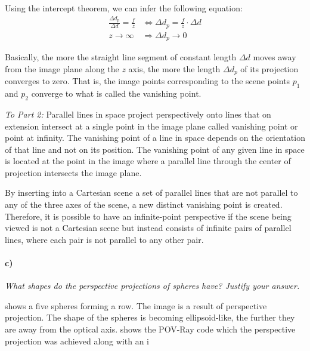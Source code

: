 \documentclass[a4paper,twocolumn]{article}
\newcommand{\subtask}[2]{\paragraph{#1)} \textit{#2} \newline}
\begin{document}
	Using the intercept theorem, we can infer the following equation:
	\begin{align*}
		\frac{\Delta d_p}{\Delta d} = \frac{f}{z} &\Leftrightarrow
		\Delta d_p = \frac{f}{z} \cdot \Delta d \\
		z \rightarrow \infty &\Rightarrow \Delta d_p \rightarrow 0
	\end{align*}
	
	Basically, the more the straight line segment of constant length $\Delta d$ moves away from the image plane along the $z$ axis, the more the length $\Delta d_p$ of its projection converges to zero. That is, the image points corresponding to the scene points $p_1$ and $p_2$ converge to what is called the vanishing point.\newline
	
	\textit{To Part 2:}
	Parallel lines in space project perspectively onto lines that on extension intersect at a single point in the image plane called vanishing point or point at infinity. The vanishing point of a line in space depends on the orientation of that line and not on its position. The vanishing point of any given line in space is located at the point in the image where a parallel line through the center of projection intersects the image plane.
	
	By inserting into a Cartesian scene a set of parallel lines that are not parallel to any of the three axes of the scene, a new distinct vanishing point is created. Therefore, it is possible to have an infinite-point perspective if the scene being viewed is not a Cartesian scene but instead consists of infinite pairs of parallel lines, where each pair is not parallel to any other pair.
	
	\subtask{c}{What shapes do the perspective projections of spheres have? Justify your answer.}
	
	 shows a five spheres forming a row. The image is a result of perspective projection. The shape of the spheres is becoming ellipsoid-like, the further they are away from the optical axis.  shows the POV-Ray code which the perspective projection was achieved along with an i
	
\end{document}
